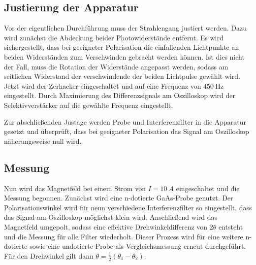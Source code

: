 \subsection{Justierung der Apparatur}

Vor der eigentlichen Durchführung muss der Strahlengang justiert werden.
Dazu wird zunächst die Abdeckung beider Photowiderstände entfernt.
Es wird sichergestellt, dass bei geeigneter Polarisation die einfallenden Lichtpunkte an beiden Widerständen zum Verschwinden gebracht werden können.
Ist dies nicht der Fall, muss die Rotation der Widerstände angepasst werden, sodass am seitlichen Widerstand der verschwindende der beiden Lichtpulse gewählt wird. \\

Jetzt wird der Zerhacker eingeschaltet und auf eine Frequenz von $\SI{450}{\hertz}$ eingestellt.
Durch Maximierung des Differenzsignals am Oszilloskop wird der Selektivverstärker auf die gewählte Frequenz eingestellt.

Zur abschließenden Justage werden Probe und Interferenzfilter in die Apparatur gesetzt und überprüft, dass bei geeigneter Polarisation das Signal am Oszilloskop
näherungsweise null wird.


\subsection{Messung}

Nun wird das Magnetfeld bei einem Strom von $I = \SI{10}{A}$ eingeschaltet und die Messung begonnen.
Zunächst wird eine n-dotierte GaAs-Probe genutzt.
Der Polarisationswinkel wird für neun verschiedene Interferenzfilter so eingestellt, dass das Signal am Oszilloskop möglichst klein wird.
Anschließend wird das Magnetfeld umgepolt, sodass eine effektive Drehwinkeldifferenz von $2\theta$ entsteht und die Messung für alle Filter wiederholt.
Dieser Prozess wird für eine weitere n-dotierte sowie eine undotierte Probe als Vergleichsmessung erneut durchgeführt. \\

Für den Drehwinkel gilt dann $\theta = \frac{1}{2} (\theta_1 - \theta_2)$.